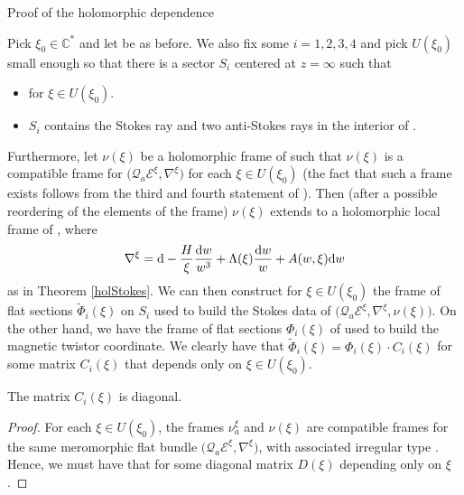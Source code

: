 \begin{subsubsection}{Proof of the holomorphic dependence}\label{proofhol}

Pick $\xi_0 \in \mathbb{C}^*$ and let  be as before. We also fix some $i=1,2,3,4$ and pick $U(\xi_0)$ small enough so that there is a sector $S_i$ centered at $z=\infty$ such that
\begin{itemize}\itemsep=0pt
 \item {} for $\xi \in U(\xi_0)$.
 \item $S_i$ contains the Stokes ray and two anti-Stokes rays in the interior of .
\end{itemize}

Furthermore, let $\nu(\xi)$ be a holomorphic frame of  such that $\nu(\xi)$ is a compatible frame for $\bigl(\mathcal{Q}_a\mathcal{E}^{\xi},\nabla^{\xi}\bigr)$ for each $\xi \in U(\xi_0)$ (the fact that such a frame exists follows from the third and fourth statement of \cite[Theorem 11.1.2]{M}). Then (after a possible reordering of the elements of the frame) $\nu(\xi)$ extends to a holomorphic local frame of , where
\begin{equation*}
 \nabla^{\xi}= {\rm d} -\frac{H}{\xi}\frac{{\rm d}w}{w^3}+\Lambda(\xi)\frac{{\rm d}w}{w} + A(w,\xi){\rm d}w
\end{equation*}
as in Theorem \ref{holStokes}. We can then construct for $\xi\in U(\xi_0)$ the frame of flat sections $\widetilde{\Phi}_i(\xi)$ on $S_i$ used to build the Stokes data of $\bigl(\mathcal{Q}_a\mathcal{E}^{\xi},\nabla^{\xi},\nu(\xi)\bigr)$. On the other hand, we have the frame of flat sections $\Phi_i(\xi)$ of  used to build the magnetic twistor coordinate. We clearly have that $\widetilde{\Phi}_i(\xi)=\Phi_i(\xi)\cdot C_i(\xi)$ for some matrix $C_i(\xi)$ that depends only on $\xi \in U(\xi_0)$.

\begin{Lemma}\label{diag} The matrix $C_i(\xi)$ is diagonal.

\end{Lemma}

\begin{proof}
For each $\xi \in U(\xi_0)$, the frames $\nu_a^{\xi}$ and $\nu(\xi)$ are compatible frames for the same meromorphic flat bundle $\bigl(\mathcal{Q}_a\mathcal{E}^{\xi},\nabla^{\xi}\bigr)$, with associated irregular type
.
Hence, we must have that  for some diagonal matrix $D(\xi)$ depending only on $\xi$.


\end{proof}
\end{subsubsection}
